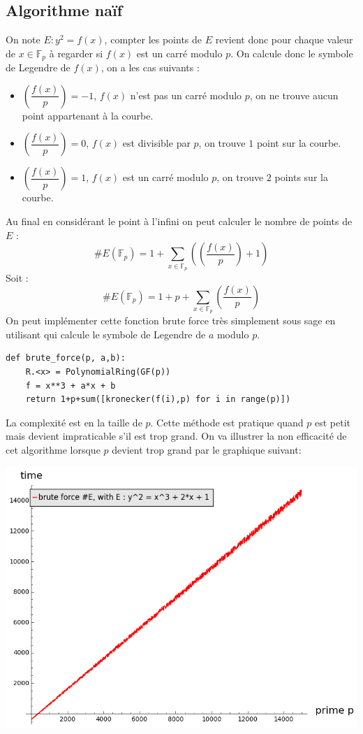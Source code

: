 \documentclass[12pt]{article}
\begin{document}
\subsection{Algorithme naïf}
On note $E: y^2 = f(x)$, compter les points de $E$ revient donc pour chaque valeur de $x \in \mathbb{F}_p$ à regarder si $f(x)$ est un carré modulo $p$. On calcule donc le symbole de Legendre de $f(x)$, on a les cas suivants : 
\begin{itemize}
\item  $\genfrac(){}{0}{f(x)}{p} = -1$, $f(x)$ n'est pas un carré modulo $p$, on ne trouve aucun point appartenant à la courbe.
\item $\genfrac(){}{0}{f(x)}{p} = 0$, $f(x)$ est divisible par $p$, on trouve $1$ point sur la courbe.
\item $\genfrac(){}{0}{f(x)}{p} = 1$, $f(x)$ est un carré modulo $p$, on trouve $2$ points sur la courbe.
\end{itemize}
\medskip
Au final en considérant le point à l'infini on peut calculer le nombre de points de $E$ : 
\begin{equation*}
\#E(\mathbb{F}_p) = 1 + \sum_{x \in \mathbb{F}_p}(\genfrac(){}{0}{f(x)}{p} + 1)
\end{equation*}
Soit : 
\begin{equation}
\#E(\mathbb{F}_p) = 1 + p +\sum_{x \in \mathbb{F}_p}\genfrac(){}{0}{f(x)}{p}
\end{equation}
On peut implémenter cette fonction brute force très simplement sous sage en utilisant  qui calcule le symbole de Legendre de $a$ modulo $p$.
\medskip
\begin{lstlisting}
def brute_force(p, a,b):
    R.<x> = PolynomialRing(GF(p))
    f = x**3 + a*x + b
    return 1+p+sum([kronecker(f(i),p) for i in range(p)])

\end{lstlisting}

\bigskip
La complexité est en la taille de $p$. Cette méthode est pratique quand $p$ est petit mais devient impraticable s'il est trop grand.
On va illustrer la non efficacité de cet algorithme lorsque $p$ devient trop grand par le graphique suivant:

\includegraphics[scale=0.5]{pictures/brute_force_cputime.png} 
\end{document}
